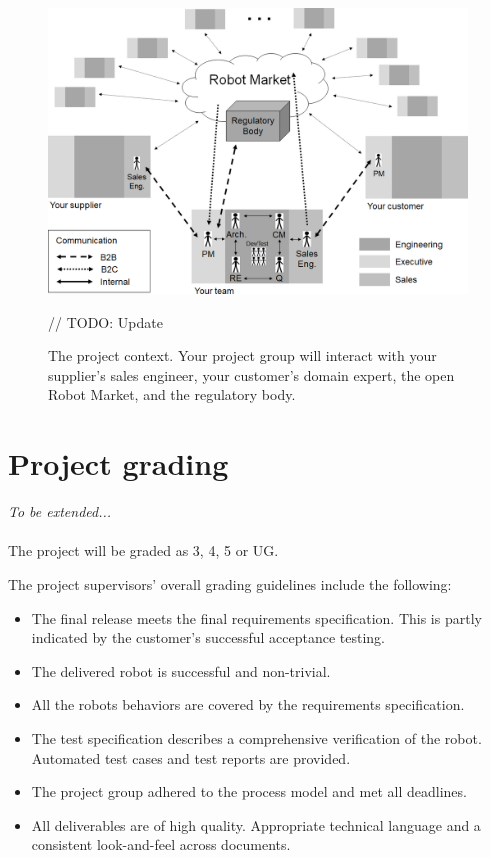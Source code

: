 \documentclass{scrreprt}
\begin{document}
\begin{figure}
\centering
\includegraphics[width=0.99\textwidth]{figures/projectContext.png}
\caption{The project context. Your project group will interact with your supplier's sales engineer, your customer's domain expert, the open Robot Market, and the regulatory body.} // TODO: Update
\label{fig:context}
\end{figure}

\section{Project grading}
\textit{To be extended...}\\\\
The project will be graded as 3, 4, 5 or UG.

The project supervisors' overall grading guidelines include the following:
\begin{itemize}
\item The final release meets the final requirements specification. This is partly indicated by the customer's successful acceptance testing.
\item The delivered robot is successful and non-trivial.
\item All the robots behaviors are covered by the requirements specification.
\item The test specification describes a comprehensive verification of the robot. Automated test cases and test reports are provided.
\item The project group adhered to the process model and met all deadlines.
\item All deliverables are of high quality. Appropriate technical language and a consistent look-and-feel across documents.
\end{itemize}
\end{document}
